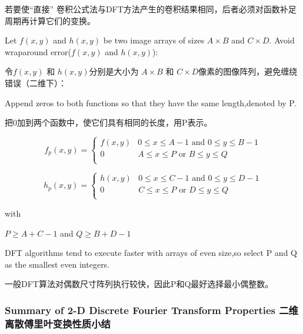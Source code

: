 \documentclass[12pt]{article}
\numberwithin{equation}{section}%
\begin{document}
若要使``直接'' 卷积公式法与DFT方法产生的卷积结果相同，后者必须对函数补足周期再计算它们的变换。

Let $f(x,y)$ and $h(x,y)$ be two image arrays of sizes $A\times B$ and $C\times D$. Avoid wraparound error($f(x,y)$ and $h(x,y)$):

令$f(x,y)$ 和 $h(x,y)$分别是大小为 $A\times B$ 和 $C\times D$像素的图像阵列，避免缠绕错误（二维下）：

Append zeros to both functions so that they have the same length,denoted by P.

把0加到两个函数中，使它们具有相同的长度，用P表示。

\begin{equation} \label{4.43}
f_{p}(x,y) = \left\{ \begin{array}{ll}
f(x,y) & \textrm{$0\leq x\leq A-1$ and $0\leq y\leq B-1$}\\
0 & \textrm{$A\leq x\leq P$ or $B\leq y\leq Q$ }\\
\end{array} \right.
\end{equation}

\begin{equation} \label{4.44}
h_{p}(x,y) = \left\{ \begin{array}{ll}
h(x,y) & \textrm{$0\leq x\leq C-1$ and $0\leq y\leq D-1$}\\
0 & \textrm{$C\leq x\leq P$ or $D\leq y\leq Q$ }\\
\end{array} \right.
\end{equation}

with 

$P\geq A+C-1$ and $Q\geq B+D-1$

DFT algorithms tend to execute faster with arrays of even size,so select P and Q as the smallest even integers.

一般DFT算法对偶数尺寸阵列执行较快，因此P和Q最好选择最小偶整数。

\subsubsection{Summary of 2-D Discrete Fourier Transform Properties 二维离散傅里叶变换性质小结}

\newpage
\end{document}
